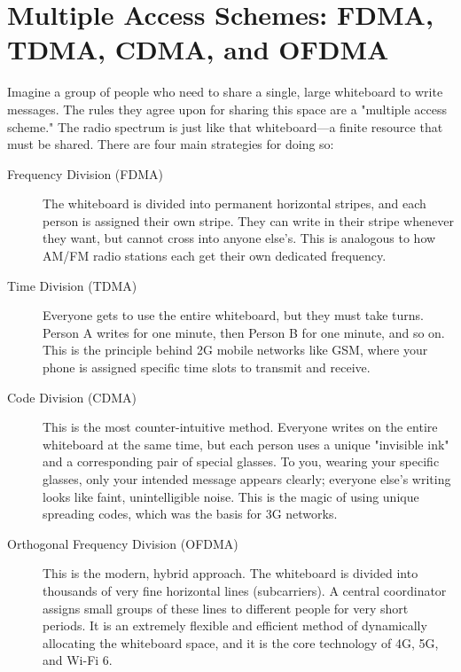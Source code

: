 
\chapter{Multiple Access Schemes: FDMA, TDMA, CDMA, and OFDMA}
\label{ch:multiple-access}

\begin{nontechnical}
    Imagine a group of people who need to share a single, large whiteboard to write messages. The rules they agree upon for sharing this space are a "multiple access scheme." The radio spectrum is just like that whiteboard—a finite resource that must be shared. There are four main strategies for doing so:

    \begin{description}
        \item[Frequency Division (FDMA)] The whiteboard is divided into permanent horizontal stripes, and each person is assigned their own stripe. They can write in their stripe whenever they want, but cannot cross into anyone else's. This is analogous to how AM/FM radio stations each get their own dedicated frequency.
        
        \item[Time Division (TDMA)] Everyone gets to use the entire whiteboard, but they must take turns. Person A writes for one minute, then Person B for one minute, and so on. This is the principle behind 2G mobile networks like GSM, where your phone is assigned specific time slots to transmit and receive.
        
        \item[Code Division (CDMA)] This is the most counter-intuitive method. Everyone writes on the entire whiteboard at the same time, but each person uses a unique "invisible ink" and a corresponding pair of special glasses. To you, wearing your specific glasses, only your intended message appears clearly; everyone else's writing looks like faint, unintelligible noise. This is the magic of using unique spreading codes, which was the basis for 3G networks.
        
        \item[Orthogonal Frequency Division (OFDMA)] This is the modern, hybrid approach. The whiteboard is divided into thousands of very fine horizontal lines (subcarriers). A central coordinator assigns small groups of these lines to different people for very short periods. It is an extremely flexible and efficient method of dynamically allocating the whiteboard space, and it is the core technology of 4G, 5G, and Wi-Fi 6.
    \end{description}
\end{nontechnical}


